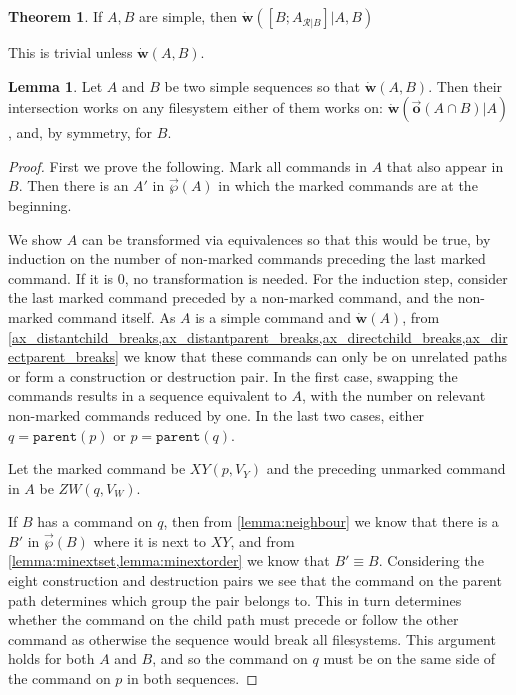 \documentclass[12pt]{article}
\newcommand{\parent}{\mathtt{parent}}
\newcommand{\fscommand}[2]{{#1#2}}
\newcommand{\cxy}{\fscommand{X}{Y}}
\newcommand{\czw}{\fscommand{Z}{W}}
\newcommand{\works}[1]{\dot{\mathbf{w}}({#1})}
\newcommand{\worksc}[2]{\dot{\mathbf{w}}({#1}|{#2})}
\newcommand{\orderset}[1]{\vec{\wp}({#1})}
\newcommand{\ordered}[1]{\vec{\mathbf{o}}({#1})}
\newcommand{\recchar}[3]{{#1}^{#3}_{\mathcal{R}|{#2}}}
\newcommand{\reca}{\recchar{A}{B}{}} %
\theoremstyle{definition}
\newtheorem{mylem}{Lemma}
\newtheorem{myth}{Theorem}
\begin{document}
\begin{myth}
If $A, B$ are simple, then $\worksc{[B;\reca]}{A,B}$
\end{myth}

This is trivial unless $\works{A,B}$.

\begin{mylem}
Let $A$ and $B$ be two simple sequences so that $\works{A, B}$.
Then their intersection works on any filesystem
either of them works on:
$\worksc{\ordered{A\cap B}}{A}$, and, by symmetry, for $B$.
\end{mylem}

\begin{proof}
First we prove the following.
Mark all commands in $A$ that also appear in $B$.
Then there is an $A'$ in $\orderset{A}$ in which the marked commands are at the beginning.

\medskip

We show $A$ can be transformed via equivalences so that this would be true,
by induction on the number of non-marked commands preceding the last marked command.
If it is 0, no transformation is needed.
For the induction step, consider the last marked command preceded by a non-marked command,
and the non-marked command itself.
As $A$ is a simple command and $\works{A}$, from 
\cref{ax_distantchild_breaks,ax_distantparent_breaks,ax_directchild_breaks,ax_directparent_breaks}
we know that these commands can only be on unrelated paths or form a construction or destruction pair.
In the first case, swapping the commands results in a sequence equivalent to $A$,
with the number on relevant non-marked commands reduced by one.
In the last two cases,
either $q=\parent(p)$ or $p=\parent(q)$.

Let the marked command be $\cxy(p, V_Y)$ and the preceding unmarked command in $A$ be $\czw(q, V_W)$.

If $B$ has a command on $q$, then
from \cref{lemma:neighbour}
we know that there is a $B'$ in $\orderset{B}$ where it is next to $\cxy$,
and from \cref{lemma:minextset,lemma:minextorder} we know that $B'\equiv B$.
Considering the eight construction and destruction pairs we see that the command
on the parent path determines which group the pair belongs to.
This in turn determines whether the command on the child path must
precede or follow the other command as otherwise the sequence would break all filesystems.
This argument holds for both $A$ and $B$, and so the command on $q$ must be on
the same side of the command on $p$ in both sequences.


\end{proof}
\end{document}

